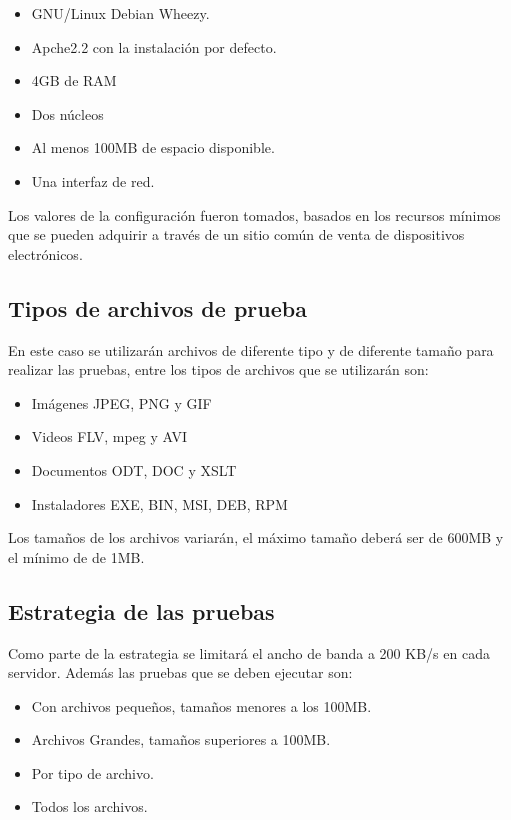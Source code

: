 \begin{itemize}
\item GNU/Linux Debian Wheezy.
\item Apche2.2 con la instalación por defecto.
\item 4GB de RAM 
\item Dos núcleos
\item Al menos 100MB de espacio disponible.
\item Una interfaz de red.
\end{itemize}

Los valores de la configuración fueron tomados, basados en los recursos mínimos que se pueden adquirir a través de un sitio común de venta de dispositivos electrónicos. 

\subsection{Tipos de archivos de prueba}
\label{subsec:archivos}
En este caso se utilizarán archivos de diferente tipo y de diferente tamaño para realizar las pruebas, entre los tipos de archivos que se utilizarán son:

\begin{itemize}
\item Imágenes JPEG, PNG y GIF
\item Videos FLV, mpeg y AVI
\item Documentos ODT, DOC y XSLT
\item Instaladores EXE, BIN, MSI, DEB, RPM
\end{itemize}

Los tamaños de los archivos variarán, el máximo tamaño deberá ser de 600MB y el mínimo de de 1MB.

\subsection{Estrategia de las pruebas}
\label{subsec:estrategia_pruebas}
Como parte de la estrategia se limitará el ancho de banda a 200 KB/s en cada servidor. Además las pruebas que se deben ejecutar son:

\begin{itemize}
\item Con archivos pequeños, tamaños menores a los 100MB.
\item Archivos Grandes, tamaños superiores a 100MB.
\item Por tipo de archivo.
\item Todos los archivos.
\end{itemize}


